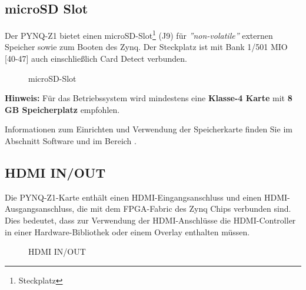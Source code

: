 \documentclass[a4paper]{report}
\begin{document}
\subsection{microSD Slot}

Der PYNQ-Z1 bietet einen microSD-Slot\footnote{Steckplatz} (J9) für \textit{''non-volatile''} externen Speicher sowie zum Booten des Zynq.
Der Steckplatz ist mit Bank 1/501 MIO [40-47] auch einschließlich Card Detect verbunden.

	\begin{figure}[H]
	\centering
	\caption{microSD-Slot}
	\label{microSD_Slot}
	\end{figure}
	
	
\textbf{Hinweis:} Für das Betriebssystem wird mindestens eine\textbf{ Klasse-4 Karte} mit \textbf{8 GB Speicherplatz} empfohlen.

Informationen zum Einrichten und Verwendung der Speicherkarte finden Sie im Abschnitt Software und im Bereich \textbf{}.



\subsection{HDMI IN/OUT}

Die PYNQ-Z1-Karte enthält einen HDMI-Eingangsanschluss und einen HDMI-Ausgangsanschluss, die mit dem FPGA-Fabric des Zynq Chips verbunden sind.
Dies bedeutet, dass zur Verwendung der HDMI-Anschlüsse die HDMI-Controller in einer Hardware-Bibliothek oder einem Overlay enthalten müssen.

	\begin{figure}[H]
	\centering
	\caption{HDMI IN/OUT}
	\label{HDMI_IN_/_OUT}
	\end{figure}
\end{document}
